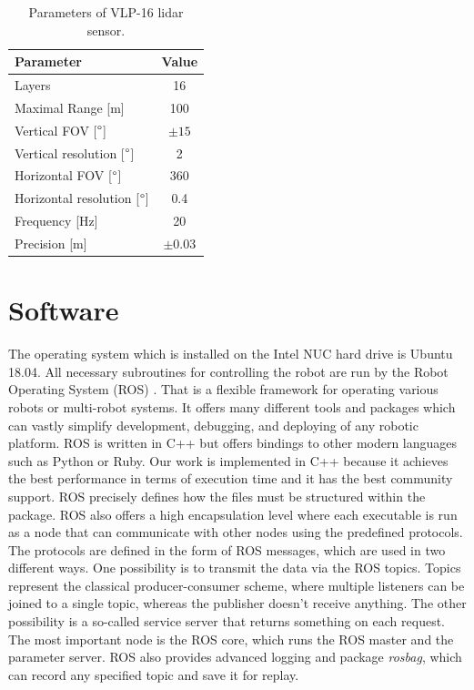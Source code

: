 \begin{table}[H]
\centering
\begin{tabular}{lc}
\toprule
Parameter & Value \\
\midrule
Layers                            & 16   \\ 
Maximal Range [m]                         & 100  \\
Vertical FOV [$\degree$]          & $\pm15$   \\ 
Vertical resolution [$\degree$]   & 2    \\ 
Horizontal FOV [$\degree$]        & 360  \\ 
Horizontal resolution [$\degree$] & 0.4  \\ 
Frequency [Hz]                    & 20    \\ 
Precision [m]                     & $\pm0.03$ \\ 
\bottomrule
\end{tabular}
\caption{Parameters of VLP-16 lidar sensor.}
\label{tab:lidar}
\end{table}

\section{Software}
The operating system which is installed on the Intel NUC hard drive is Ubuntu 18.04. All necessary subroutines for controlling the robot are run by the Robot Operating System (ROS) \cite{ros}. That is a flexible framework for operating various robots or multi-robot systems. It offers many different tools and packages which can vastly simplify development, debugging, and deploying of any robotic platform. ROS is written in C++ but offers bindings to other modern languages such as Python or Ruby. Our work is implemented in C++ because it achieves the best performance in terms of execution time and it has the best community support. ROS precisely defines how the files must be structured within the package. ROS also offers a high encapsulation level where each executable is run as a node that can communicate with other nodes using the predefined protocols. The protocols are defined in the form of ROS messages, which are used in two different ways. One possibility is to transmit the data via the ROS topics. Topics represent the classical producer-consumer scheme, where multiple listeners can be joined to a single topic, whereas the publisher doesn't receive anything. The other possibility is a so-called service server that returns something on each request. The most important node is the ROS core, which runs the ROS master and the parameter server. ROS also provides advanced logging and package \textit{rosbag}, which can record any specified topic and save it for replay.

